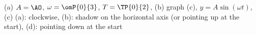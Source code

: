 (a) $A = \AO$, $\omega = \omP{0}{3}$, $T = \TP{0}{2}$, (b) graph (c), $y = A\sin(\omega t)$, (c) (a): clockwise, (b): shadow on the horizontal axis (or pointing up at the start), (d): pointing down at the start
